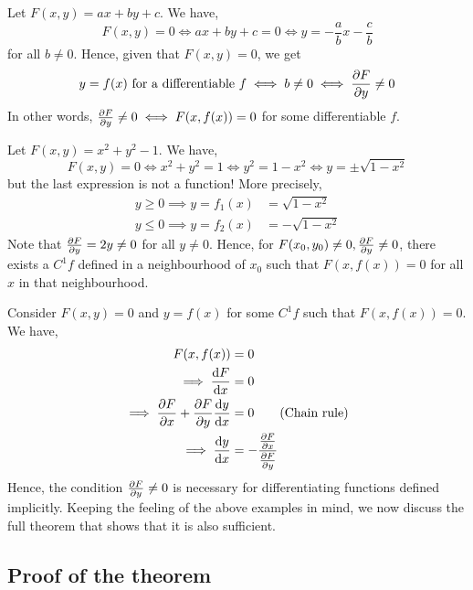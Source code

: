 \documentclass[../Analysis-3.tex]{subfiles}
\begin{document}
\begin{Eg}{}{}
  Let \( F(x,y) = ax+by+c \). We have,
  \[
    F(x,y) = 0 \iff ax+by+c = 0 \iff y = -\frac ab x - \frac cb
  \]
  for all \( b \neq 0 \). Hence, given that \( F(x,y) = 0 \), we get
  \[
    y = f(x) \text{ for a differentiable } f \iff b \neq 0 \iff \pdv{F}{y} \neq 0
  \]
  In other words, \( \pdv{F}{y} \neq 0 \iff F(x,f(x)) = 0 \) for some differentiable \( f \).
\end{Eg}

\begin{Eg}{}{}
  Let \( F(x,y) = x^2 + y^2 - 1 \). We have,
  \[
    F(x,y) = 0 \iff x^2 + y^2 = 1 \iff y^2 = 1 - x^2 \iff y = \pm \sqrt{1-x^2}
  \]
  but the last expression is not a function! More precisely,
  \begin{align*}
    y \geq 0 \implies y = f_1(x) & = \sqrt{1-x^2}   \\
    y \leq 0 \implies y = f_2(x) & = - \sqrt{1-x^2}
  \end{align*}
  Note that \( \pdv{F}{y} = 2y \neq 0 \) for all \( y \neq 0 \). Hence, for \( F(x_0,y_0) \neq 0, \pdv{F}{y}(x_0, y_0) \neq 0 \), there exists a \( C^1 f \) defined in a neighbourhood of \( x_0  \) such that \( F(x,f(x)) = 0 \) for all \( x \) in that neighbourhood.
\end{Eg}

\begin{noteBox}{}{}
  Consider \( F(x,y) = 0 \) and \( y = f(x) \) for some \( C^1 f \) such that \( F(x,f(x)) = 0 \).
  We have,
  \begin{align*}
    F(x,f(x))                                 & = 0                               \\
    \implies \dv{F}{x}                        & = 0                               \\
    \implies \pdv{F}{x} + \pdv{F}{y}\dv{y}{x} & = 0 \tag{Chain rule}              \\
    \implies \dv{y}{x}                        & = - \frac{\pdv{F}{x}}{\pdv{F}{y}}
  \end{align*}
  Hence, the condition \( \pdv{F}{y} \neq 0 \) is necessary for differentiating functions defined implicitly. Keeping the feeling of the above examples in mind, we now discuss the full theorem that shows that it is also sufficient.
\end{noteBox}

\subsection{Proof of the theorem}
\end{document}
